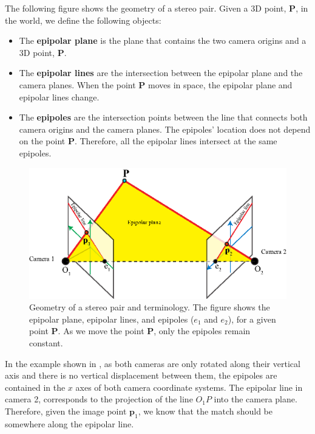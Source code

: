
The following figure shows the geometry of a stereo pair. Given a 3D point, $\mathbf{P}$, in the world, we define the following objects:
\begin{itemize}
\item The {\bf epipolar plane} is the plane that contains the two camera origins and a 3D point, $\mathbf{P}$. 

\item The {\bf epipolar lines} are the intersection between the epipolar plane and the camera planes. When the point $\mathbf{P}$ moves in space, the epipolar plane and epipolar lines change. 

\item The {\bf epipoles} are the intersection points between the line that connects both camera origins and the camera planes.  The epipoles' location does not depend on the point $\mathbf{P}$. Therefore, all the epipolar lines intersect at the same epipoles.
\end{itemize}

\begin{figure}[h!]
\centerline{
\includegraphics[width=0.8\linewidth]{figures/3d_scene_understanding/epipolar_geometry.eps}
}
\caption{Geometry of a stereo pair and terminology. The figure shows the epipolar plane, epipolar lines, and epipoles ($e_1$ and $e_2$), for a given point $\mathbf{P}$. As we move the point $\mathbf{P}$, only the epipoles remain constant.}
\label{fig:epipolar_geometry_terminology}
\end{figure}

In the example shown in \fig{\ref{fig:epipolar_geometry_terminology}}, as both cameras are only rotated along their vertical axis and there is no vertical displacement between them, the epipoles are contained in the $x$ axes of both camera coordinate systems.  
The epipolar line in camera 2, corresponds to the projection of the line $O_1 P$ into the camera plane. Therefore, given the image point $\mathbf{p}_1$, we know that the match should be somewhere along the epipolar line. 

